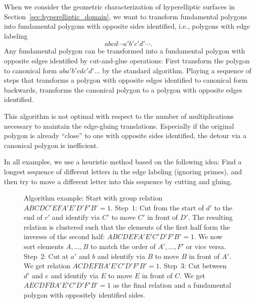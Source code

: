\documentclass[Thesis]{subfiles}
\begin{document}

When we consider the geometric characterization of hyperelliptic
surfaces in Section~\ref{sec:hyperelliptic_domain}, we want to
transform fundamental polygons into fundamental polygons with opposite
sides identified, i.e., polygons with edge labeling 
\begin{equation*}
abcd\cdots a'b'c'd'\cdots.
\end{equation*}
Any fundamental polygon can be transformed into a fundamental polygon
with opposite edges identified by cut-and-glue operations: First
transform the polygon to canonical form $aba'b'cdc'd'\ldots$ by the
standard algorithm. Playing a sequence of steps that transforms
a polygon with opposite edges identified to canonical form backwards,
transforms the canonical polygon to a polygon with opposite edges
identified.

This algorithm is not optimal with respect to the number of
multiplications necessary to maintain the edge-gluing
translations. Especially if the original polygon is already ``close''
to one with opposite sides identified, the detour via a canonical
polygon is inefficient.  

In all examples, we use a heuristic method based on the following
idea: Find a longest sequence of different letters in the edge
labeling (ignoring primes), and then try to move a different letter
into this sequence by cutting and gluing.

 \begin{figure}
 \caption{Algorithm example: Start with group relation $ABCDC' EFA'E'D'F'B' = 1$. Step~$1$: Cut from the start of $d'$ to the end of $c'$ and identify via $C'$ to move $C'$ in front of $D'$. The resulting relation is clustered such that the elements of the first half form the inverses of the second half: $ABCDEFA'E'C'D'F'B' = 1$. We now sort elements $A,\ldots,B$ to match the order of $A',\ldots,F'$ or vice versa. Step~$2$: Cut at $a'$ and $b$ and identify via $B$ to move $B$ in front of $A'$. We get relation $ACDEFBA'E'C'D'F'B' = 1$. Step~$3$: Cut between $d'$ and $e$ and identify via $E$ to move $E$ in front of $C$. We get $AECDFBA'E'C'D'F'B' = 1$ as the final relation and a fundamental polygon with oppositely identified sides.}
 \label{fig:opposite_algorithm}
 \end{figure}
\end{document}
